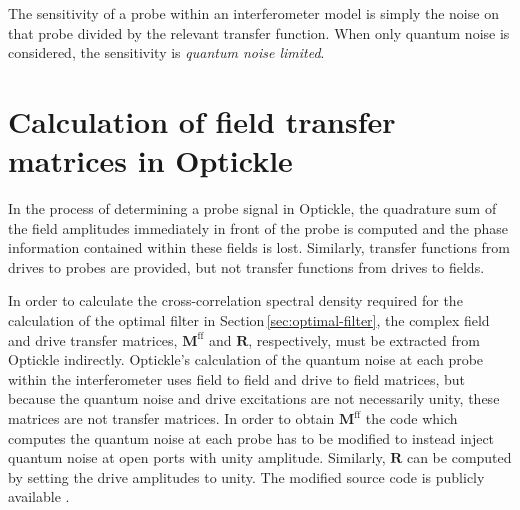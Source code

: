 The sensitivity of a probe within an interferometer model is simply the noise on that probe divided by the relevant transfer function. When only quantum noise is considered, the sensitivity is \emph{quantum noise limited}.

\section{\label{sec:optickle-field-tfs}Calculation of field transfer matrices in Optickle}
In the process of determining a probe signal in Optickle, the quadrature sum of the field amplitudes immediately in front of the probe is computed and the phase information contained within these fields is lost. Similarly, transfer functions from drives to probes are provided, but not transfer functions from drives to fields.

In order to calculate the cross-correlation spectral density required for the calculation of the optimal filter in Section\,\ref{sec:optimal-filter}, the complex field and drive transfer matrices, $\mathbf{M}^{\textrm{ff}}$ and $\mathbf{R}$, respectively, must be extracted from Optickle indirectly. Optickle's calculation of the quantum noise at each probe within the interferometer uses field to field and drive to field matrices, but because the quantum noise and drive excitations are not necessarily unity, these matrices are not transfer matrices. In order to obtain $\mathbf{M}^{\textrm{ff}}$ the code which computes the quantum noise at each probe has to be modified to instead inject quantum noise at open ports with unity amplitude. Similarly, $\mathbf{R}$ can be computed by setting the drive amplitudes to unity. The modified source code is publicly available \cite{controlspaperdata}.